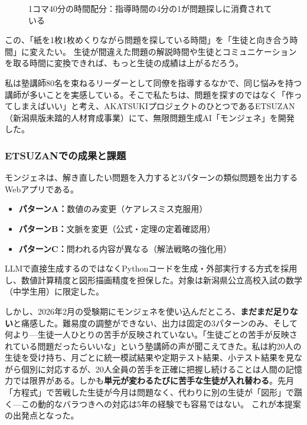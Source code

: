 \documentclass[paper=a4,fontsize=10.5bp,jafontsize=10.5bp,twocolumn]{jlreq}
\begin{document}
\begin{figure}[t]
\centering
{}
\caption{1コマ40分の時間配分：指導時間の4分の1が問題探しに消費されている}
\label{fig:time_pie}
\end{figure}

この、「紙を1枚1枚めくりながら問題を探している時間」を「生徒と向き合う時間」に変えたい。
生徒が間違えた問題の解説時間や生徒とコミュニケーションを取る時間に変換できれば、もっと生徒の成績は上がるだろう。

私は塾講師80名を束ねるリーダーとして同僚を指導するなかで、同じ悩みを持つ講師が多いことを実感している。そこで私たちは、問題を探すのではなく「作ってしまえばいい」と考え、AKATSUKIプロジェクトのひとつであるETSUZAN（新潟県版未踏的人材育成事業）にて、無限問題生成AI「モンジェネ」を開発した。

\subsubsection{ETSUZANでの成果と課題}

モンジェネは、解き直したい問題を入力すると3パターンの類似問題を出力するWebアプリである。

\begin{itemize}
  \item \textbf{パターンA：}数値のみ変更（ケアレスミス克服用）
  \item \textbf{パターンB：}文脈を変更（公式・定理の定着確認用）
  \item \textbf{パターンC：}問われる内容が異なる（解法戦略の強化用）
\end{itemize}

LLMで直接生成するのではなくPythonコードを生成・外部実行する方式を採用し、数値計算精度と図形描画精度を担保した。対象は新潟県公立高校入試の数学（中学生用）に限定した。

しかし、2026年2月の受験期にモンジェネを使い込んだところ、\textbf{まだまだ足りない}と痛感した。難易度の調整ができない、出力は固定の3パターンのみ、そして何より---生徒一人ひとりの苦手が反映されていない。「生徒ごとの苦手が反映されている問題だったらいいな」という塾講師の声が聞こえてきた。私は約20人の生徒を受け持ち、月ごとに統一模試結果や定期テスト結果、小テスト結果を見ながら個別に対応するが、20人全員の苦手を正確に把握し続けることは人間の記憶力では限界がある。しかも\textbf{単元が変わるたびに苦手な生徒が入れ替わる}。先月「方程式」で苦戦した生徒が今月は問題なく、代わりに別の生徒が「図形」で躓く---この動的なバラつきへの対応は5年の経験でも容易ではない。 これが本提案の出発点となった。
\end{document}

